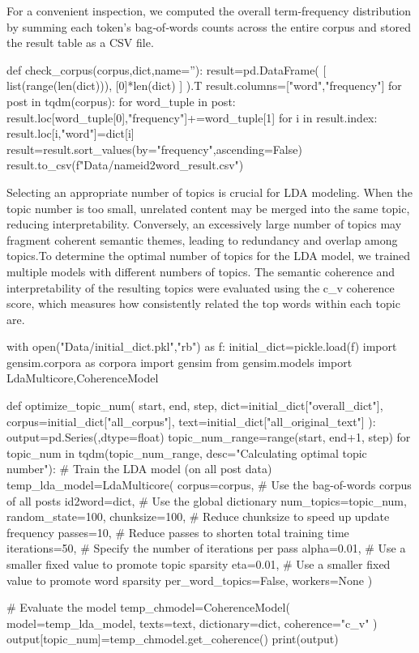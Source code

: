 \documentclass[12pt]{article}
\begin{document}
	For a convenient inspection, we computed the overall term‐frequency distribution by summing each token’s bag‐of‐words counts across the entire corpus and stored the result table as a CSV file.
	\begin{python}
def check_corpus(corpus,dict,name=''):
    result=pd.DataFrame(
        [
            list(range(len(dict))),
            [0]*len(dict)
        ]
    ).T
    result.columns=["word","frequency"]
    for post in tqdm(corpus):
        for word_tuple in post:
            result.loc[word_tuple[0],"frequency"]+=word_tuple[1]
    for i in result.index:
        result.loc[i,"word"]=dict[i]
    result=result.sort_values(by="frequency",ascending=False)
    result.to_csv(f"Data/{name}id2word_result.csv")
	\end{python}
	
	Selecting an appropriate number of topics is crucial for LDA modeling. When the topic number is too small, unrelated content may be merged into the same topic, reducing interpretability. Conversely, an excessively large number of topics may fragment coherent semantic themes, leading to redundancy and overlap among topics.To determine the optimal number of topics for the LDA model, we trained multiple models with different numbers of topics. The semantic coherence and interpretability of the resulting topics were evaluated using the c\_v coherence score, which measures how consistently related the top words within each topic are. 
	\begin{python}
with open("Data/initial_dict.pkl","rb") as f:
    initial_dict=pickle.load(f)
import gensim.corpora as corpora
import gensim
from gensim.models import LdaMulticore,CoherenceModel

def optimize_topic_num(
  start,
  end,
  step,
  dict=initial_dict["overall_dict"],
  corpus=initial_dict["all_corpus"],
  text=initial_dict["all_original_text"]      
):
  output=pd.Series({},dtype=float)
  topic_num_range=range(start, end+1, step)
  for topic_num in tqdm(topic_num_range, desc="Calculating optimal topic number"):
    # Train the LDA model (on all post data)
    temp_lda_model=LdaMulticore(
        corpus=corpus,    # Use the bag-of-words corpus of all posts
        id2word=dict,     # Use the global dictionary
        num_topics=topic_num,
        random_state=100,
        chunksize=100,    # Reduce chunksize to speed up update frequency
        passes=10,        # Reduce passes to shorten total training time
        iterations=50,    # Specify the number of iterations per pass
        alpha=0.01,       # Use a smaller fixed value to promote topic sparsity
        eta=0.01,         # Use a smaller fixed value to promote word sparsity
        per_word_topics=False,  
        workers=None                    
    )

    # Evaluate the model 
    temp_chmodel=CoherenceModel(
        model=temp_lda_model,
        texts=text,
        dictionary=dict,
        coherence="c_v"
    )
    output[topic_num]=temp_chmodel.get_coherence()
  print(output)
	\end{python}
	
\end{document}

